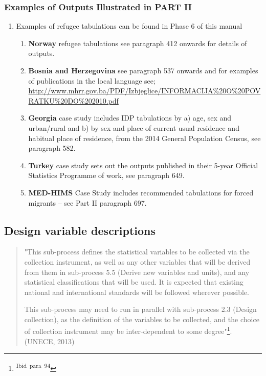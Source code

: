 \documentclass[
]{article}
\begin{document}
\hypertarget{examples-of-outputs-illustrated-in-part-ii}{%
\subsubsection{Examples of Outputs Illustrated in PART II}\label{examples-of-outputs-illustrated-in-part-ii}}

\begin{enumerate}
\def\labelenumi{\arabic{enumi}.}
\setcounter{enumi}{72}
\item
  Examples of refugee tabulations can be found in Phase 6 of this
  manual

  \begin{enumerate}
  \def\labelenumii{\arabic{enumii}.}
  \item
    \textbf{Norway} refugee tabulations see paragraph 412 onwards for
    details of outputs.
  \item
    \textbf{Bosnia and Herzegovina} see paragraph 537 onwards and for
    examples of publications in the local language see;
    \url{http://www.mhrr.gov.ba/PDF/Izbjeglice/INFORMACIJA\%20O\%20POVRATKU\%20DO\%202010.pdf}
  \item
    \textbf{Georgia} case study includes IDP tabulations by a) age, sex
    and urban/rural and b) by sex and place of current usual
    residence and habitual place of residence, from the 2014 General
    Population Census, see paragraph 582.
  \item
    \textbf{Turkey} case study sets out the outputs published in their
    5-year Official Statistics Programme of work, see paragraph 649.
  \item
    \textbf{MED-HIMS} Case Study includes recommended tabulations for
    forced migrants -- see Part II paragraph 697.
  \end{enumerate}
\end{enumerate}

\hypertarget{design-variable-descriptions-1}{%
\subsection{Design variable descriptions}\label{design-variable-descriptions-1}}

\begin{quote}
"This sub-process defines the statistical variables to be collected
via the collection instrument, as well as any other variables that
will be derived from them in sub-process 5.5 (Derive new variables and
units), and any statistical classifications that will be used. It is
expected that existing national and international standards will be
followed wherever possible.

This sub-process may need to run in parallel with sub-process 2.3
(Design collection), as the definition of the variables to be
collected, and the choice of collection instrument may be
inter-dependent to some degree"\footnote{\textsuperscript{Ibid~para~94}}. (UNECE, 2013)
\end{quote}
\end{document}
